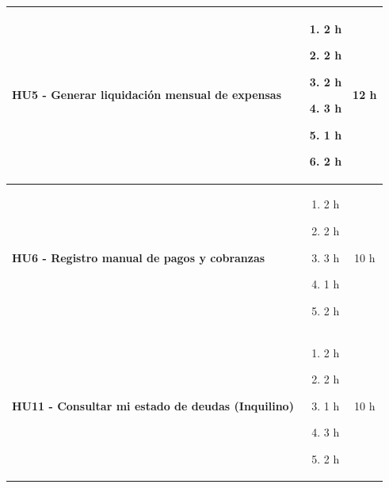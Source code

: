 \begin{longtable}{|p{10.5cm}|p{2.5cm}|c|}
    \\ \hline
        
            \textbf{HU5 - Generar liquidación mensual de expensas} 
        
        &

            \begin{enumerate}[leftmargin=*,nosep]
                \item 2 h
                \item 2 h
                \item 2 h
                \item 3 h
                \item 1 h
                \item 2 h
            \end{enumerate} 
        
        &
         12 h
    \\ \hline
        
            \textbf{HU6 - Registro manual de pagos y cobranzas} 
        
        &

            \begin{enumerate}[leftmargin=*,nosep]
                \item 2 h
                \item 2 h
                \item 3 h
                \item 1 h
                \item 2 h
            \end{enumerate} 
        
        &
         10 h
    \\ \hline
        
            \textbf{HU11 - Consultar mi estado de deudas (Inquilino)} 
        
        &

            \begin{enumerate}[leftmargin=*,nosep]
                \item 2 h
                \item 2 h
                \item 1 h
                \item 3 h
                \item 2 h
            \end{enumerate} 
        
        &
            10 h
    

\end{longtable}

